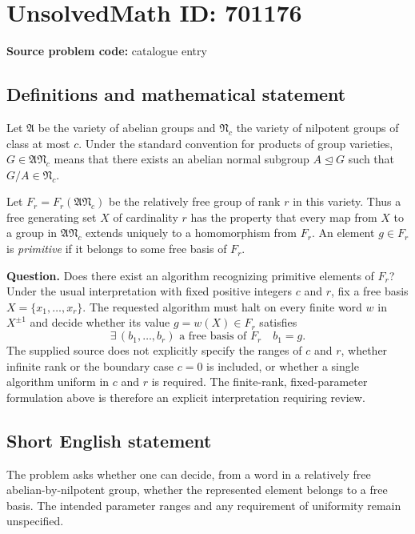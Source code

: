 \documentclass[11pt]{article}
\begin{document}
\section*{UnsolvedMath ID: 701176}
\textbf{Source problem code:} catalogue entry
\subsection{Definitions and mathematical statement}
Let \(\mathfrak A\) be the variety of abelian groups and \(\mathfrak N_c\) the variety of nilpotent groups of class at most \(c\). Under the standard convention for products of group varieties, \(G\in\mathfrak A\mathfrak N_c\) means that there exists an abelian normal subgroup \(A\trianglelefteq G\) such that \(G/A\in\mathfrak N_c\).

Let \(F_r=F_r(\mathfrak A\mathfrak N_c)\) be the relatively free group of rank \(r\) in this variety. Thus a free generating set \(X\) of cardinality \(r\) has the property that every map from \(X\) to a group in \(\mathfrak A\mathfrak N_c\) extends uniquely to a homomorphism from \(F_r\). An element \(g\in F_r\) is \emph{primitive} if it belongs to some free basis of \(F_r\).

\textbf{Question.} Does there exist an algorithm recognizing primitive elements of \(F_r\)? Under the usual interpretation with fixed positive integers \(c\) and \(r\), fix a free basis \(X=\{x_1,\ldots,x_r\}\). The requested algorithm must halt on every finite word \(w\) in \(X^{\pm1}\) and decide whether its value \(g=w(X)\in F_r\) satisfies
\[
\exists\,(b_1,\ldots,b_r)\text{ a free basis of }F_r\quad b_1=g.
\]
The supplied source does not explicitly specify the ranges of \(c\) and \(r\), whether infinite rank or the boundary case \(c=0\) is included, or whether a single algorithm uniform in \(c\) and \(r\) is required. The finite-rank, fixed-parameter formulation above is therefore an explicit interpretation requiring review.
\subsection{Short English statement}
The problem asks whether one can decide, from a word in a relatively free abelian-by-nilpotent group, whether the represented element belongs to a free basis. The intended parameter ranges and any requirement of uniformity remain unspecified.
\end{document}
